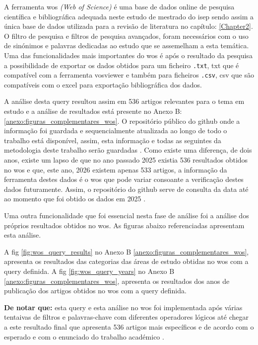 A ferramenta \gls{wos} \textit{(Web of Science)} é uma base de dados online de pesquisa científica e bibliográfica adequada neste estudo de mestrado do \gls{isep}  sendo assim a única base de dados utilizada para a revisão de literatura no capítulo: \ref{Chapter2}.
O filtro de pesquisa e filtros de pesquisa avançados, foram necessários com o uso de sinónimos e palavras dedicadas ao estudo que se assemelham a esta temática.
Uma das funcionalidades mais importantes do \gls{wos} é após o resultado da pesquisa a possibilidade de exportar os dados obtidos para um ficheiro \verb|.txt|, \gls{txt} que é compatível com a ferramenta \gls{vosviewer} e também para ficheiros \verb|.csv|, \gls{csv} que são compatíveis com o \gls{excel} para exportação bibliográfica dos dados.

A análise desta \gls{query} resultou assim em 536 artigos relevantes para o tema em estudo e a análise de resultados está presente no Anexo B: \ref{anexo:figuras_complementares_wos}.
O repositório público do \gls{github} onde a informação foi guardada e sequencialmente atualizada ao longo de todo o trabalho está disponível, assim,  esta informação e todas as seguintes da metodologia deste trabalho serão guardadas \cite{JunqueiraDevEduardoRepositório}.
Como existe uma diferença, de dois anos, existe um lapso de que no  ano passado 2025 existia 536 resultados obtidos no \gls{wos}  e que, este ano, 2026 existem apenas 533 artigos, a informação da ferramenta destes dados é o \gls{wos} que pode variar consoante a verificação destes dados futuramente. Assim, o repositório do \gls{github} serve de consulta da data até ao momento que foi obtido os dados em 2025 \cite{JunqueiraDevEduardoRepositório}.

Uma outra funcionalidade que foi essencial nesta fase de análise foi a análise dos próprios resultados obtidos no \gls{wos}.
As figuras abaixo referenciadas apresentam esta análise.

A \gls{fig} \ref{fig:wos_query_results} no Anexo B \ref{anexo:figuras_complementares_wos}, apresenta os resultados das categorias das áreas de estudo obtidas no \gls{wos} com a \gls{query} definida.
A \gls{fig} \ref{fig:wos_query_years} no Anexo B \ref{anexo:figuras_complementares_wos}, apresenta os resultados dos anos de publicação dos artigos obtidos no \gls{wos} com a \gls{query} definida.

\textbf{De notar que:} esta \gls{query} e esta análise no \gls{wos} foi implementada após várias tentaivas de filtros e palavras-chave com diferentes operadores lógicos até chegar a este resultado final que apresenta 536 artigos mais específicos e de acordo com o esperado e com o enunciado do trabalho académico \cite{MoodleEnunciado}.


